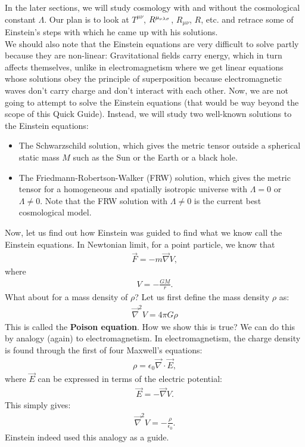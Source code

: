 \documentclass{book}
\theoremstyle{definition}
\begin{document}
In the later sections, we will study cosmology with and without the cosmological constant $\Lambda$. Our plan is to look at $T^{\mu\nu}$, $\tensor{R}{^{\mu_{\nu\lambda\sigma}}}$, $R_{\mu\nu}$, $R$, etc. and retrace some of Einstein's steps with which he came up with his solutions. \\

We should also note that the Einstein equations are very difficult to solve partly because they are non-linear: Gravitational fields carry energy, which in turn affects themselves, unlike in electromagnetism where we get linear equations whose solutions obey the principle of superposition because electromagnetic waves don't carry charge and don't interact with each other. Now, we are not going to attempt to solve the Einstein equations (that would be way beyond the scope of this Quick Guide). Instead, we will study two well-known solutions to the Einstein equations:
\begin{itemize}
	\item The Schwarzschild solution, which gives the metric tensor outside a spherical static mass $M$ such as the Sun or the Earth or a black hole. 
	\item The Friedmann-Robertson-Walker (FRW) solution, which gives the metric tensor for a homogeneous and spatially isotropic universe with $\Lambda = 0$ or $\Lambda \neq 0$. Note that the FRW solution with $\Lambda \neq 0$ is the current best cosmological model.  
\end{itemize}

Now, let us find out how Einstein was guided to find what we know call the Einstein equations. In Newtonian limit, for a point particle, we know that
\begin{align*}
\vec{F} = -m\vec{\nabla}V, 
\end{align*}
where 
\begin{align*}
V = -\frac{GM}{r}.
\end{align*}
What about for a mass density of $\rho$? Let us first define the mass density $\rho$ as:
\begin{align*}
\boxed{\vec{\nabla}^2V = 4\pi G \rho}
\end{align*}
This is called the \textbf{Poison equation}. How we show this is true? We can do this by analogy (again) to electromagnetism. In electromagnetism, the charge density is found through the first of four Maxwell's equations:
\begin{align*}
\rho = \epsilon_0\vec{\nabla}\cdot\vec{E},
\end{align*}
where $\vec{E}$ can be expressed in terms of the electric potential:
\begin{align*}
\vec{E} = -\vec{\nabla}V.
\end{align*}
This simply gives:
\begin{align*}
\vec{\nabla}^2V = -\frac{\rho}{\epsilon_0}.
\end{align*}
Einstein indeed used this analogy as a guide. 
\end{document}
